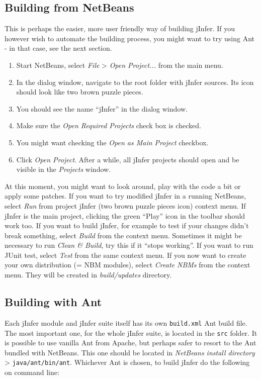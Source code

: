 \documentclass[a4paper,10pt,oneside]{article}
\begin{document}
\subsection*{Building from NetBeans}
\par 
  This is perhaps the easier, more user friendly way of building jInfer.
    If you however wish to automate the building process, you might want to
    try using Ant - in that case, see the next section.

\begin{enumerate}\item 
 Start NetBeans, select \textit{File} > \textit{Open Project...} from the main menu.
  \item In the dialog window, navigate to the root folder with jInfer sources.
    Its icon should look like two brown puzzle pieces.
  \item You should see the name ``jInfer'' in the dialog window.
  \item Make sure the \textit{Open Required Projects} check box is checked.
  \item You might want checking the \textit{Open as Main Project} checkbox.
  \item Click \textit{Open Project}. After a while, all jInfer projects should
    open and be visible in the \textit{Projects} window.
  \end{enumerate}\par At this moment, you might want to look around, play with the
  code a bit or apply some patches. If you want to try modified jInfer in a
  running NetBeans, select \textit{Run} from project jInfer (two brown puzzle
  pieces icon) context menu. If jInfer is the main project, clicking the
  green ``Play'' icon in the toolbar should work too.
  If you want to build jInfer, for example to test if your changes didn't break
  something, select \textit{Build} from the context menu. Sometimes it might be
  necessary to run \textit{Clean \& Build}, try this if it ``stops working''.
  If you want to run JUnit test, select \textit{Test} from the same context menu.
  If you now want to create your own distribution (= NBM modules), select
  \textit{Create NBMs} from the context menu. They will be created in
  \textit{build/updates} directory.
\subsection*{Building with Ant}
\par 
  Each jInfer module and jInfer suite itself has
  its own \texttt{build.xml} Ant build file. The most important one, for the
  whole jInfer suite, is located in the \texttt{src} folder.
  It is possible to use vanilla Ant from Apache, but perhaps safer to resort
  to the Ant bundled with NetBeans. This one should be located in \textit{NetBeans
    install directory} > \texttt{java/ant/bin/ant}.
  Whichever Ant is chosen, to build jInfer do the following on command line:
\end{document}
